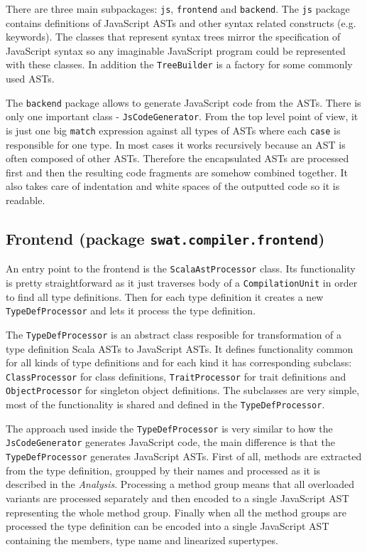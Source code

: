 \documentclass[12pt,a4paper]{report}
\begin{document}
There are three main subpackages: \texttt{js}, \texttt{frontend} and \texttt{backend}. The \texttt{js} package contains definitions of JavaScript ASTs and other syntax related constructs (e.g. keywords). The classes that represent syntax trees mirror the specification of JavaScript syntax \cite{EcmaScript} so any imaginable JavaScript program could be represented with these classes. In addition the \texttt{TreeBuilder} is a factory for some commonly used ASTs.

The \texttt{backend} package allows to generate JavaScript code from the ASTs. There is only one important class - \texttt{JsCodeGenerator}. From the top level point of view, it is just one big \texttt{match} expression against all types of ASTs where each \texttt{case} is responsible for one type. In most cases it works recursively because an AST is often composed of other ASTs. Therefore the encapsulated ASTs are processed first and then the resulting code fragments are somehow combined together. It also takes care of indentation and white spaces of the outputted code so it is readable.

\subsection{Frontend (package \texttt{swat.compiler.frontend})}

An entry point to the frontend is the \texttt{ScalaAstProcessor} class. Its functionality is pretty straightforward as it just traverses body of a \texttt{CompilationUnit} in order to find all type definitions. Then for each type definition it creates a new \texttt{TypeDefProcessor} and lets it process the type definition.

The \texttt{TypeDefProcessor} is an abstract class resposible for transformation of a type definition Scala ASTs to JavaScript ASTs. It defines functionality common for all kinds of type definitions and for each kind it has corresponding subclass: \texttt{ClassProcessor} for class definitions, \texttt{TraitProcessor} for trait definitions and \texttt{ObjectProcessor} for singleton object definitions. The subclasses are very simple, most of the functionality is shared and defined in the \texttt{TypeDefProcessor}.

The approach used inside the \texttt{TypeDefProcessor} is very similar to how the \texttt{JsCodeGenerator} generates JavaScript code, the main difference is that the \texttt{TypeDefProcessor} generates JavaScript ASTs. First of all, methods are extracted from the type definition, groupped by their names and processed as it is described in the {\it Analysis}. Processing a method group means that all overloaded variants are processed separately and then encoded to a single JavaScript AST representing the whole method group. Finally when all the method groups are processed the type definition can be encoded into a single JavaScript AST containing the members, type name and linearized supertypes.
\end{document}
